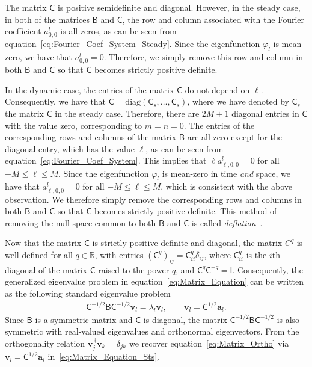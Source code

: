 \documentclass[leqno,onefignum,onetabnum]{siamltex1213}
\newcommand{\Bm}{\mathsf{B}}
\newcommand{\Cm}{\mathsf{C}}
\newcommand{\Ib}{\mathsf{I}}
\newcommand{\vecv}{\boldsymbol{v}}
\newcommand{\veca}{\boldsymbol{a}}
\begin{document}
The matrix $\Cm$ is positive semidefinite and diagonal. However, in
the steady case, in both of the matrices $\Bm$ and $\Cm$, the row
and column associated with the Fourier coefficient $a^l_{0,0}$ is all
zeros, as can be seen
from equation~\eqref{eq:Fourier_Coef_System_Steady}. Since the
eigenfunction $\varphi_l$ is mean-zero, we have that
$a^l_{0,0}=0$. Therefore, we simply remove 
this row and column in both $\Bm$ and $\Cm$ so that $\Cm$ becomes
strictly positive definite.


In the dynamic case, the entries of the
matrix $\Cm$ do not depend on $\ell$. Consequently, we have that
$\Cm=\text{diag}(\Cm_s,\ldots,\Cm_s)$, where we have denoted by $\Cm_s$ the matrix
$\Cm$ in the steady case. Therefore, there are $2M+1$ diagonal entries
in $\Cm$ with the value zero, corresponding to $m=n=0$. The entries of
the corresponding rows and columns of the matrix $\Bm$ are all zero
except for the diagonal entry, which has the value $\ell$, as can be seen
from equation~\eqref{eq:Fourier_Coef_System}. This implies that
$\ell a^l_{\ell,0,0}=0$ for all $-M\leq\ell\leq M$. Since the eigenfunction $\varphi_l$ is
mean-zero in time \emph{and} space, we have that $a^l_{\ell,0,0}=0$ for
all $-M\leq\ell\leq M$, which is consistent with the above observation. We
therefore simply remove the corresponding rows and columns in both
$\Bm$ and $\Cm$ so that $\Cm$ becomes strictly positive definite. This
method of removing the null space common to both $\Bm$ and $\Cm$ is
called \emph{deflation}~\cite{Parlett:1980}.



Now that the matrix $\Cm$ is strictly positive definite and diagonal,
the matrix $C^q$ is well defined for all $q\in\mathbb{R}$, with entries
$(\Cm^q)_{ij}=\Cm_{ii}^q \delta_{ij}$, where $\Cm_{ii}^q$ is the $i$th
diagonal of the matrix $\Cm$ raised to the power $q$, and
$\Cm^q\Cm^{-q}=\Ib$. Consequently, 
the generalized eigenvalue problem in
equation~\eqref{eq:Matrix_Equation} can be written as the following
standard eigenvalue problem
%
\begin{align}\label{eq:Matrix_Equation_Sts}
  \Cm^{-1/2}\Bm\Cm^{-1/2}\vecv_l=\lambda_l\vecv_l,
  \qquad
  \vecv_l=\Cm^{1/2}\veca_l.
\end{align}
%
Since $\Bm$ is a symmetric matrix and $\Cm$ is diagonal, the matrix
$\Cm^{-1/2}\Bm\Cm^{-1/2}$ is also symmetric with real-valued
eigenvalues and orthonormal eigenvectors. From the
orthogonality relation $\vecv_j^{\,\dagger}\vecv_k=\delta_{jk}$ we recover
equation~\eqref{eq:Matrix_Ortho} via $\vecv_l=\Cm^{1/2}\veca_l$
in~\eqref{eq:Matrix_Equation_Sts}. 
\end{document}

